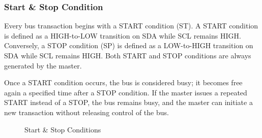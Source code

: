 \subsubsection{Start \& Stop Condition}
\label{chap:Back_I2C_Protocol_Start_Stop}

Every bus transaction begins with a START condition (ST). A START condition 
is defined as a HIGH-to-LOW transition on SDA while SCL remains HIGH. 
Conversely, a STOP condition (SP) is defined as a LOW-to-HIGH transition on SDA 
while SCL remains HIGH. Both START and STOP conditions are always generated 
by the master.

Once a START condition occurs, the bus is considered busy; it becomes free 
again a specified time after a STOP condition. If the master issues a repeated 
START instead of a STOP, the bus remains busy, and the master can initiate a new 
transaction without releasing control of the bus.

\begin{figure}[H]
    \centering
    \caption{Start \& Stop Conditions}
    \label{fig:Start_/&_stop}
\end{figure}
